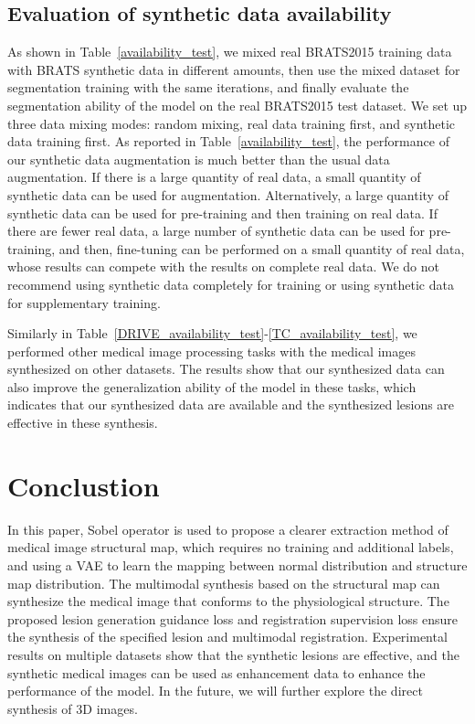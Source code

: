 \documentclass[runningheads]{llncs}
\begin{document}
	\subsection{Evaluation of synthetic data availability}
	As shown in Table~\ref{availability_test}, we mixed real BRATS2015 training data with BRATS synthetic data in different amounts, then use the mixed dataset for segmentation training with the same iterations, and finally evaluate the segmentation ability of the model on the real BRATS2015 test dataset. We set up three data mixing modes: random mixing, real data training first, and synthetic data training first. As reported in Table~\ref{availability_test}, the performance of our synthetic data augmentation is much better than the usual data augmentation. If there is a large quantity of real data, a small quantity of synthetic data can be used for augmentation. Alternatively, a large quantity of synthetic data can be used for pre-training and then training on real data. If there are fewer real data, a large number of synthetic data can be used for pre-training, and then, fine-tuning can be performed on a small quantity of real data, whose results can compete with the results on complete real data.  We do not recommend using synthetic data completely for training or using synthetic data for supplementary training.
	
	Similarly in Table~\ref{DRIVE_availability_test}-\ref{TC_availability_test}, we performed other medical image processing tasks with the medical images synthesized on other datasets. The results show that our synthesized data can also improve the generalization ability of the model in these tasks, which indicates that our synthesized data are available and the synthesized lesions are effective in these synthesis.
	\section{Conclustion}
	In this paper, Sobel operator is used to propose a clearer extraction method of medical image structural map, which requires no training and additional labels, and using a VAE to learn the mapping between normal distribution and structure map distribution. The multimodal synthesis based on the structural map can synthesize the medical image that conforms to the physiological structure. The proposed lesion generation guidance loss and registration supervision loss ensure the synthesis of the specified lesion and multimodal registration. Experimental results on multiple datasets show that the synthetic lesions are effective, and the synthetic medical images can be used as enhancement data to enhance the performance of the model. In the future, we will further explore the direct synthesis of 3D images.
	
	
		
\end{document}
